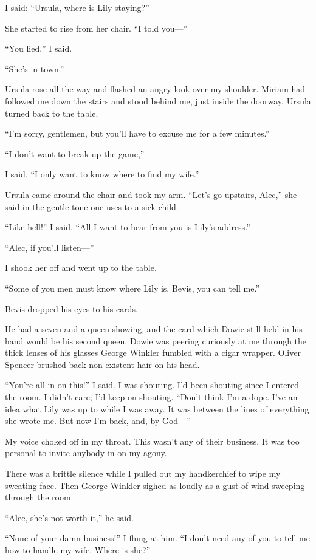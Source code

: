 \documentclass{novel}
\begin{document}
I said: “Ursula, where is Lily staying?”

She started to rise from her chair. “I told you—”

“You lied,” I said. 

“She’s in town.”

Ursula rose all the way and flashed an angry look over my shoulder. Miriam had followed me down the stairs and stood behind me, just inside the doorway. Ursula turned back to the table.

“I’m sorry, gentlemen, but you’ll have to excuse me for a few minutes.”

“I don’t want to break up the game,”

I said. “I only want to know where to find my wife.”

Ursula came around the chair and took my arm. “Let’s go upstairs, Alec,” she said in the gentle tone one uses to a sick child.

“Like hell!” I said. “All I want to hear from you is Lily’s address.”

“Alec, if you’ll listen—”

I shook her off and went up to the table.

“Some of you men must know where Lily is. Bevis, you can tell me.”

Bevis dropped his eyes to his cards.

He had a seven and a queen showing, and the card which Dowie still held in his hand would be his second queen. Dowie was peering curiously at me through the thick lenses of his glasses George Winkler fumbled with a cigar wrapper. Oliver Spencer brushed back non-existent hair on his head.

“You’re all in on this!” I said. I was shouting. I’d been shouting since I entered the room. I didn’t care; I’d keep on shouting. “Don’t think I’m a dope. I’ve an idea what Lily was up to while I was away. It was between the lines of everything she wrote me. But now I’m back, and, by God—”

My voice choked off in my throat. This wasn’t any of their business. It was too personal to invite anybody in on my agony.

There was a brittle silence while I pulled out my handkerchief to wipe my sweating face. Then George Winkler sighed as loudly as a gust of wind sweeping through the room.

“Alec, she’s not worth it,” he said.

“None of your damn business!” I flung at him. “I don’t need any of you to tell me how to handle my wife. Where is she?”
\end{document}
